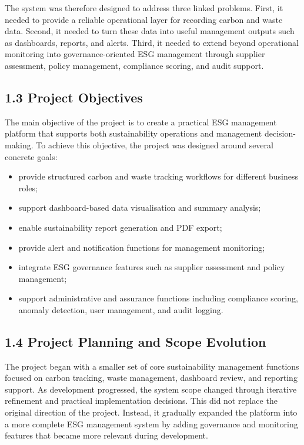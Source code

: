 \documentclass[10pt,a4paper]{article}
\begin{document}
The system was therefore designed to address three linked problems. First, it needed to provide a reliable operational layer for recording carbon and waste data. Second, it needed to turn these data into useful management outputs such as dashboards, reports, and alerts. Third, it needed to extend beyond operational monitoring into governance-oriented ESG management through supplier assessment, policy management, compliance scoring, and audit support.

\subsection*{1.3 Project Objectives}
The main objective of the project is to create a practical ESG management platform that supports both sustainability operations and management decision-making. To achieve this objective, the project was designed around several concrete goals:

\begin{itemize}[leftmargin=1.4em,itemsep=2pt,topsep=2pt]
    \item provide structured carbon and waste tracking workflows for different business roles;
    \item support dashboard-based data visualisation and summary analysis;
    \item enable sustainability report generation and PDF export;
    \item provide alert and notification functions for management monitoring;
    \item integrate ESG governance features such as supplier assessment and policy management;
    \item support administrative and assurance functions including compliance scoring, anomaly detection, user management, and audit logging.
\end{itemize}

\subsection*{1.4 Project Planning and Scope Evolution}
The project began with a smaller set of core sustainability management functions focused on carbon tracking, waste management, dashboard review, and reporting support. As development progressed, the system scope changed through iterative refinement and practical implementation decisions. This did not replace the original direction of the project. Instead, it gradually expanded the platform into a more complete ESG management system by adding governance and monitoring features that became more relevant during development.
\end{document}

